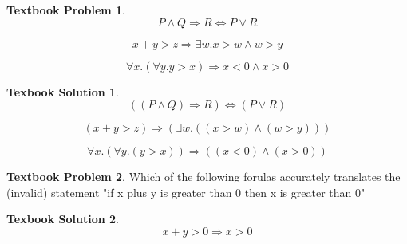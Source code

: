 \documentclass[10pt]{article}
\theoremstyle{definition}
\newtheorem{bp}{Textbook Problem}
\newtheorem{ts}{Texbook Solution}
\begin{document}
  \begin{bp}
  
  \begin{equation}
  P \wedge Q \Rightarrow R \Leftrightarrow P \vee R
  \end{equation}
  
  \begin{equation}
  x + y > z \Rightarrow \exists w.x > w \wedge
  w > y
  \end{equation}
  
  \begin{equation}
  \forall x. (\forall y.y  >  x)  \Rightarrow  x  <  0 \wedge  x  >  0
  \end{equation}
  
  \end{bp}
  
  \begin{ts}
   
  \begin{equation}
  ((P \wedge Q) \Rightarrow R) \Leftrightarrow (P \vee R)
  \end{equation}
  
  \begin{equation}
  (x + y > z) \Rightarrow (\exists w.((x > w) \wedge
  (w > y)))
  \end{equation}
  
  \begin{equation}
  \forall x. (\forall y.(y  >  x)) \Rightarrow  ((x  <  0) \wedge  (x  >  0))
  \end{equation}
  
  
  
  
  \end{ts}
  
  \begin{bp}
  Which of the following forulas accurately translates the (invalid) statement "if x plus y is greater than 0 then x is greater than 0"
  \end{bp}
  
  \begin{ts}
  \begin{equation}
  x + y > 0 \Rightarrow x > 0
  \end{equation}
  \end{ts}
  
  
  
\end{document}
